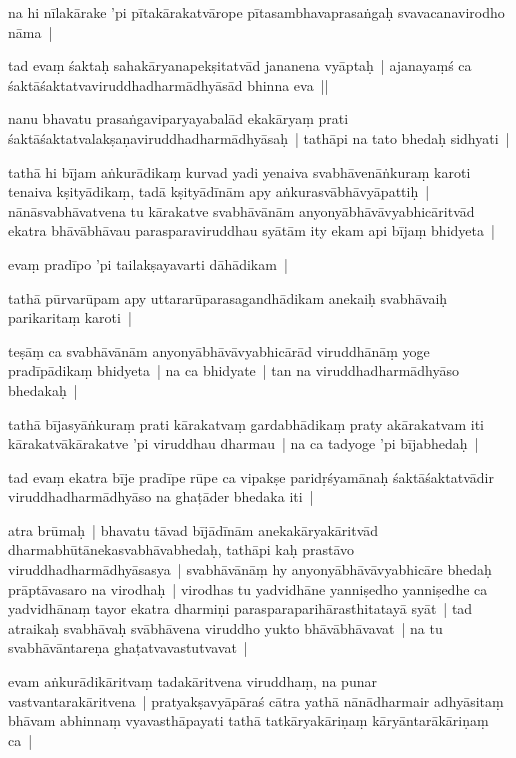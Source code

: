\documentclass[article,a4paper]{memoir}
\begin{document}
	  \pstart na hi nī\-lakā\-rake 'pi pī\-takā\-rakatvā\-rope pī\-tasambhavaprasaṅgaḥ svavacanavirodho nā\-ma | 
	\pend
      

	  \pstart tad evaṃ śaktaḥ sahakā\-ryanapekṣitatvā\-d jananena vyā\-ptaḥ | ajanayaṃś ca śaktā\-śaktatvaviruddhadharmā\-dhyā\-sā\-d bhinna eva ||
	\pend
      

	  \pstart nanu bhavatu prasaṅgaviparyayabalā\-d ekakā\-ryaṃ prati śaktā\-śaktatvalakṣaṇaviruddhadharmā\-dhyā\-saḥ | tathā\-pi na tato bhedaḥ sidhyati | 
	\pend
      

	  \pstart tathā\- hi bī\-jam aṅkurā\-dikaṃ kurvad yadi yenaiva svabhā\-venā\-ṅkuraṃ karoti tenaiva kṣityā\-dikaṃ, tadā\- kṣityā\-dī\-nā\-m apy aṅkurasvā\-bhā\-vyā\-pattiḥ | nā\-nā\-svabhā\-vatvena tu kā\-rakatve svabhā\-vā\-nā\-m anyonyā\-bhā\-vā\-vyabhicā\-ritvā\-d ekatra bhā\-vā\-bhā\-vau parasparaviruddhau syā\-tā\-m ity ekam api bī\-jaṃ bhidyeta |
	\pend
      

	  \pstart evaṃ pradī\-po 'pi tailakṣayavarti dā\-hā\-dikam | 
	\pend
      

	  \pstart tathā\- pū\-rvarū\-pam apy uttararū\-parasagandhā\-dikam anekaiḥ svabhā\-vaiḥ parikaritaṃ karoti | 
	\pend
      

	  \pstart teṣā\-ṃ ca svabhā\-vā\-nā\-m anyonyā\-bhā\-vā\-vyabhicā\-rā\-d viruddhā\-nā\-ṃ yoge pradī\-pā\-dikaṃ bhidyeta | na ca bhidyate | tan na viruddhadharmā\-dhyā\-so bhedakaḥ | 
	\pend
      

	  \pstart tathā\- bī\-jasyā\-ṅkuraṃ prati kā\-rakatvaṃ gardabhā\-dikaṃ praty akā\-rakatvam iti kā\-rakatvā\-kā\-rakatve 'pi viruddhau dharmau | na ca tadyoge 'pi bī\-jabhedaḥ | 
	\pend
      

	  \pstart tad evaṃ ekatra bī\-je pradī\-pe rū\-pe ca vipakṣe paridṛśyamā\-naḥ śaktā\-śaktatvā\-dir viruddhadharmā\-dhyā\-so na ghaṭā\-der bhedaka iti |
	\pend
      

	  \pstart atra brū\-maḥ | bhavatu tā\-vad bī\-jā\-dī\-nā\-m anekakā\-ryakā\-ritvā\-d dharmabhū\-tā\-nekasvabhā\-vabhedaḥ, tathā\-pi kaḥ prastā\-vo viruddhadharmā\-dhyā\-sasya | svabhā\-vā\-nā\-ṃ hy anyonyā\-bhā\-vā\-vyabhicā\-re bhedaḥ prā\-ptā\-vasaro na virodhaḥ | virodhas tu yadvidhā\-ne yanniṣedho yanniṣedhe ca yadvidhā\-naṃ tayor ekatra dharmiṇi parasparaparihā\-rasthitatayā\- syā\-t | tad atraikaḥ svabhā\-vaḥ svā\-bhā\-vena viruddho yukto bhā\-vā\-bhā\-vavat | na tu svabhā\-vā\-ntareṇa ghaṭatvavastutvavat | 
	\pend
      

	  \pstart evam aṅkurā\-dikā\-ritvaṃ tadakā\-ritvena viruddhaṃ, na punar vastvantarakā\-ritvena | pratyakṣavyā\-pā\-raś cā\-tra yathā\- nā\-nā\-dharmair adhyā\-sitaṃ bhā\-vam abhinnaṃ vyavasthā\-payati tathā\- tatkā\-ryakā\-riṇaṃ kā\-ryā\-ntarā\-kā\-riṇaṃ ca | 
	\pend
      
\end{document}
